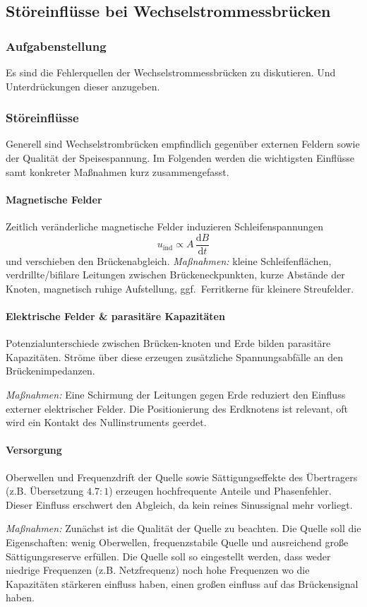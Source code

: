 \subsection{Störeinflüsse bei Wechselstrommessbrücken}\label{sec:3-1-stoereinfluesse-wechselstrombruecken}

\subsubsection{Aufgabenstellung}

Es sind die Fehlerquellen der Wechselstrommessbrücken zu diskutieren. Und Unterdrückungen dieser anzugeben.

\subsubsection{Störeinflüsse}
Generell sind Wechselstrombrücken empfindlich gegenüber externen Feldern sowie der
Qualität der Speisespannung. Im Folgenden werden die wichtigsten Einflüsse samt
konkreter Maßnahmen kurz zusammengefasst.

\paragraph{Magnetische Felder}
Zeitlich veränderliche magnetische Felder induzieren Schleifenspannungen \cite[S.~49, Gl.~2.24]{EMTPraktikum2025}
\[
	u_{\text{ind}} \propto A\,\frac{\mathrm{d} B}{\mathrm{d}t}
\]
und verschieben den Brückenabgleich. \textit{Maßnahmen:} kleine Schleifenflächen,
verdrillte/bifilare Leitungen zwischen Brückeneckpunkten, kurze Abstände der Knoten,
magnetisch ruhige Aufstellung, ggf.\ Ferritkerne für kleinere Streufelder.

\paragraph{Elektrische Felder \& parasitäre Kapazitäten}
Potenzialunterschiede zwischen Brücken-knoten und Erde bilden parasitäre Kapazitäten.
Ströme über diese erzeugen zusätzliche Spannungsabfälle an den
Brückenimpedanzen.

\textit{Maßnahmen:} Eine Schirmung der Leitungen gegen Erde reduziert den
Einfluss externer elektrischer Felder. Die Positionierung des Erdknotens ist
relevant, oft wird ein Kontakt des Nullinstruments geerdet. \cite[S.50]{EMTPraktikum2025}

\paragraph{Versorgung}
Oberwellen und Frequenzdrift der Quelle sowie Sättigungseffekte des
Übertragers (z.B. Übersetzung $4.7:1$) erzeugen hochfrequente Anteile und
Phasenfehler. Dieser Einfluss erschwert den Abgleich, da kein reines Sinussignal mehr
vorliegt.

\textit{Maßnahmen:} Zunächst ist die Qualität der Quelle zu beachten. Die
Quelle soll die Eigenschaften: wenig Oberwellen, frequenzstabile Quelle und
ausreichend große Sättigungsreserve erfüllen.
Die Quelle soll so eingestellt werden, dass weder niedrige Frequenzen (z.B. Netzfrequenz)
noch hohe Frequenzen wo die Kapazitäten stärkeren einfluss haben, einen großen einfluss auf das
Brückensignal haben. \cite[S.50]{EMTPraktikum2025}
